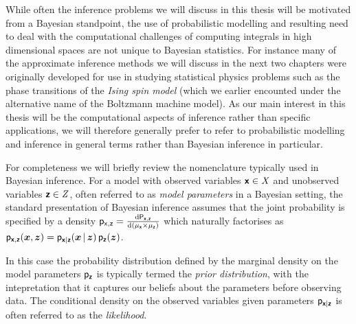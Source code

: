 While often the inference problems we will discuss in this thesis will be motivated from a Bayesian standpoint, the use of probabilistic modelling and resulting need to deal with the computational challenges of computing integrals in high dimensional spaces are not unique to Bayesian statistics. For instance many of the approximate inference methods we will discuss in the next two chapters were originally developed for use in studying statistical physics problems such as the phase transitions of the \emph{Ising spin model} (which we earlier encounted under the alternative name of the Boltzmann machine model). As our main interest in this thesis will be the computational aspects of inference rather than specific applications, we will therefore generally prefer to refer to probabilistic modelling and inference in general terms rather than Bayesian inference in particular.


For completeness we will briefly review the nomenclature typically used in Bayesian inference. For a model with observed variables $\boldsymbol{\mathsf{x}} \in \mathit{X}$ and unobserved variables $\boldsymbol{\mathsf{z}} \in \mathit{Z}$, often referred to as \emph{model parameters} in a Bayesian setting, the standard presentation of Bayesian inference assumes that the joint probability is specified by a density $\mathsf{p}_{\mathsf{x},\mathsf{z}} = \frac{\mathrm{d} \mathsf{P}_{\boldsymbol{\mathsf{x}},\boldsymbol{\mathsf{z}}}}{\mathrm{d} (\mu_{\boldsymbol{\mathsf{x}}} \times \mu_{\boldsymbol{\mathsf{z}}})}$ which naturally factorises as $\mathsf{p}_{\boldsymbol{\mathsf{x}},\boldsymbol{\mathsf{z}}}(\boldsymbol{x},\boldsymbol{z}) = \mathsf{p}_{\boldsymbol{\mathsf{x}}|\boldsymbol{\mathsf{z}}}(\boldsymbol{x}\operatorname{|}\boldsymbol{z})\,\mathsf{p}_{\boldsymbol{\mathsf{z}}}(\boldsymbol{z})$. 

In this case the probability distribution defined by the marginal density on the model parameters $\mathsf{p}_{\boldsymbol{\mathsf{z}}}$ is typically termed the \emph{prior distribution}, with the intepretation that it captures our beliefs about the parameters before observing data. The conditional density on the observed variables given parameters $\mathsf{p}_{\boldsymbol{\mathsf{x}}|\boldsymbol{\mathsf{z}}}$ is often referred to as the \emph{likelihood}.%


